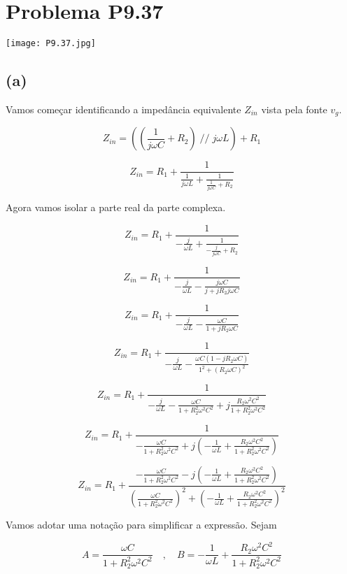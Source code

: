 \section*{Problema P9.37}

\begin{center}
    \texttt{[image: P9.37.jpg]}
\end{center}

\subsection*{(a)}

Vamos começar identificando a impedância equivalente \( Z_{in} \) vista pela fonte \( v_g \).

\[ Z_{in} = \left(\left(\frac{1}{j\omega C} + R_2\right) \; // \; j\omega L\right) +  R_1 \]

\[ Z_{in} = R_1 + \frac{1}{\frac{1}{j\omega L} + \frac{1}{\frac{1}{j\omega C} + R_2}}  \]

Agora vamos isolar a parte real da parte complexa.

\[ Z_{in} = R_1 + \frac{1}{-\frac{j}{\omega L} + \frac{1}{-\frac{j}{j\omega C} + R_2}}  \]

\[ Z_{in} = R_1 + \frac{1}{-\frac{j}{\omega L} - \frac{j\omega C}{j + jR_2j\omega C}}  \]

\[ Z_{in} = R_1 + \frac{1}{-\frac{j}{\omega L} - \frac{\omega C}{1 + jR_2\omega C}}  \]

\[ Z_{in} = R_1 + \frac{1}{-\frac{j}{\omega L} - \frac{\omega C(1 - jR_2\omega C)}{1^2 + (R_2\omega C)^2}}  \]

\[ Z_{in} = R_1 + \frac{1}{-\frac{j}{\omega L} - \frac{\omega C}{1 + R_2^2\omega^2 C^2} + j\frac{R_2\omega^2 C^2}{1 + R_2^2\omega^2 C^2}}  \]

\[ Z_{in} = R_1 + \frac{1}{- \frac{\omega C}{1 + R_2^2\omega^2 C^2} + j\left(-\frac{1}{\omega L} + \frac{R_2\omega^2 C^2}{1 + R_2^2\omega^2 C^2}\right)}  \]

\[ Z_{in} = R_1 + \frac{- \frac{\omega C}{1 + R_2^2\omega^2 C^2} - j\left(-\frac{1}{\omega L} + \frac{R_2\omega^2 C^2}{1 + R_2^2\omega^2 C^2}\right)}{(\frac{\omega C}{1 + R_2^2\omega^2 C^2})^2 + \left(-\frac{1}{\omega L} + \frac{R_2\omega^2 C^2}{1 + R_2^2\omega^2 C^2}\right)^2}  \]

Vamos adotar uma notação para simplificar a expressão. Sejam

\[ 
    A = \frac{\omega C}{1 + R_2^2\omega^2 C^2}
    \quad , \quad
    B = -\frac{1}{\omega L} + \frac{R_2\omega^2 C^2}{1 + R_2^2\omega^2 C^2}
\]

